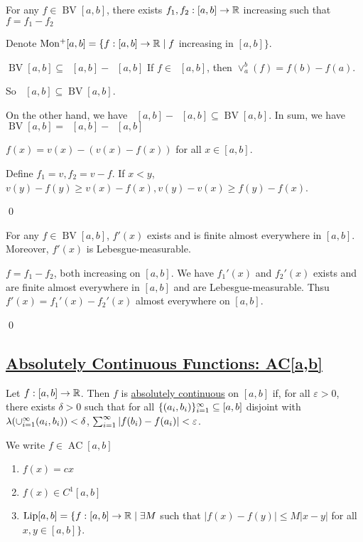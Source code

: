 \documentclass[x11names,reqno,14pt]{extarticle}
\newcommand{\seq}[2][\oo]{_{#2 = 1}^#1}
\newcommand{\cupi}[1][\oo]{\cup\seq[#1]{i}}
\DeclareMathOperator{\BV}{BV}
\DeclareMathOperator{\Monp}{Mon^+}
\DeclareMathOperator{\AC}{AC}
\DeclareMathOperator{\Lip}{Lip}
\begin{document}
\thm 

For any $f \in\BV[a, b]$, there exists $f_1, f_2:[a,b]\to\mathbb{R}$ increasing such that $f = f_1 - f_2$

\rem

Denote $\Monp[a, b] = \{f:[a,b]\to\R\mid f$ increasing in $[a, b]\}$. 

$\BV[a,b]\subseteq\Monp[a,b]-\Monp[a, b]$
If $f \in \Monp[a,b]$, then $\vee_a^b(f) = f(b) - f(a)$.

So $\Monp[a,b]\subseteq\BV[a,b]$. 

On the other hand, we have $\Monp[a,b]-\Monp[a,b]\subseteq\BV[a,b]$. In sum, we have $\BV[a,b] = \Monp[a,b] - \Monp[a, b]$

\proof

$f(x) = v(x) - (v(x) - f(x))$ for all $x \in [a, b]$. 

Define $f_1 = v, f_2 = v - f$. If $x < y$, $v(y) - f(y) \geq v(x) - f(x), v(y) - v(x) \geq f(y) - f(x)$.

\qed

\thm For any $f \in \BV[a,b]$, $f'(x)$ exists and is finite almost everywhere in $[a,b]$. Moreover, $f'(x)$ is Lebesgue-measurable.

\proof

$f = f_1 - f_2$, both increasing on $[a,b]$. We have $f_1'(x)$ and $f_2'(x)$ exists and are finite almost everywhere in $[a,b]$ and are Lebesgue-measurable. Thsu $f'(x) = f_1'(x) - f_2'(x)$ almost everywhere on $[a,b]$.

\qed

\subsection*{\underline{Absolutely Continuous Functions: AC[a,b]}}


Let $f:[a,b]\to\mathbb{R}$. Then $f$ is \underline{absolutely continuous} on $[a, b]$ if, for all $\varepsilon>0$, there exists $\delta>0$ such that for all $\{(a_i, b_i)\}\seq{i} \subseteq [a, b]$ disjoint with $\lambda(\cupi(a_i,b_i))<\delta$, $\sum\seq{i}|f(b_i) - f(a_i)| < \varepsilon$. 

We write $f \in \AC[a,b]$

\exm

\begin{enumerate}

\item $f(x) = cx$

\item $f(x) \in C^1[a,b]$

\item $\Lip[a,b] = \{f:[a,b]\to\R \mid \exists M$ such that $|f(x) - f(y)| \leq M|x - y|$ for all $x, y \in [a, b]\}$. 

\end{enumerate}
\end{document}
